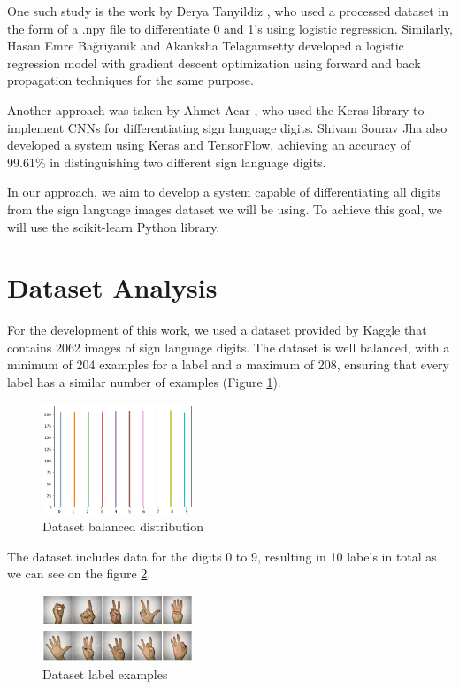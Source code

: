\documentclass[conference]{IEEEtran}
\begin{document}
One such study is the work by Derya Tanyildiz \cite{tanyildiz}, who used a processed dataset in the form of a .npy file to differentiate 0 and 1's using logistic regression. Similarly, Hasan Emre Bağriyanik \cite{bagriyanik} and Akanksha Telagamsetty \cite{telagamsetty} developed a logistic regression model with gradient descent optimization using forward and back propagation techniques for the same purpose.

Another approach was taken by Ahmet Acar \cite{acar}, who used the Keras library to implement CNNs for differentiating sign language digits. Shivam Sourav Jha \cite{jha} also developed a system using Keras and TensorFlow, achieving an accuracy of 99.61\% in distinguishing two different sign language digits.

In our approach, we aim to develop a system capable of differentiating all digits from the sign language images dataset we will be using. To achieve this goal, we will use the scikit-learn Python library.
\section{Dataset Analysis}
For the development of this work, we used a dataset provided by Kaggle that contains 2062 images of sign language digits. The dataset is well balanced, with a minimum of 204 examples for a label and a maximum of 208, ensuring that every label has a similar number of examples (Figure \ref{fig:dataset-balanced}). 

\begin{figure}[h]
    \centering
    \includegraphics[width=0.4\textwidth]{assets/dataset-labels.png}
    \caption{Dataset balanced distribution}
    \label{fig:dataset-balanced}
\end{figure}

The dataset includes data for the digits 0 to 9, resulting in 10 labels in total as we can see on the figure \ref{fig:dataset-examples}. 

\begin{figure}[h]
    \centering
    \includegraphics[width=0.4\textwidth]{assets/sign-language-digits.png}
    \caption{Dataset label examples}
    \label{fig:dataset-examples}
\end{figure}
\end{document}
